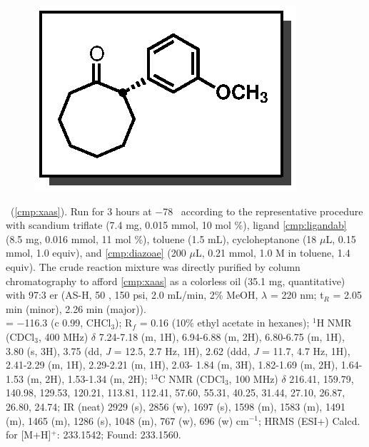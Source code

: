 \pagebreak
\begin{figure}
  \vspace{-12pt}
  \begin{center}
    \includegraphics[scale=0.8]{chp_asymmetric/images/xaas}
  \end{center}
  \vspace{-25pt}
\end{figure}\noindent \textbf{\CMPxaas}\ (\ref{cmp:xaas}). Run for 3 hours
at $-$78 \degc\  according to the representative procedure with scandium
triflate (7.4 mg, 0.015 mmol, 10 mol \%), ligand \ref{cmp:ligandab} (8.5 mg, 0.016 mmol,
11 mol \%), toluene (1.5 mL), cycloheptanone (18 $\mu$L, 0.15 mmol, 1.0 equiv),
and \ref{cmp:diazoae} (200 $\mu$L, 0.21 mmol, 1.0 M in toluene, 1.4 equiv). The
crude reaction mixture was directly purified by column chromatography to afford
\ref{cmp:xaas} as a colorless oil (35.1 mg, quantitative) with 97:3 er (AS-H, 50
\degc, 150 psi, 2.0 mL/min, 2\% MeOH, $\lambda$ = 220 nm; t$_R$ = 2.05 min
(minor), 2.26 min (major)). \\
\rotation = $-$116.3 (c 0.99, CHCl$_3$); R$_f$ = 0.16 (10\% ethyl acetate in
hexanes); $^1$H NMR (CDCl$_3$, 400 MHz) $\delta$ 7.24-7.18 (m, 1H), 6.94-6.88
(m, 2H), 6.80-6.75 (m, 1H), 3.80 (s, 3H), 3.75 (dd, \textit{J} =  12.5, 2.7 Hz,
1H), 2.62 (ddd, \textit{J} =  11.7, 4.7 Hz, 1H), 2.41-2.29 (m, 1H), 2.29-2.21
(m, 1H), 2.03- 1.84 (m, 3H), 1.82-1.69 (m, 2H), 1.64-1.53 (m, 2H), 1.53-1.34 (m,
2H); $^{13}$C NMR (CDCl$_3$, 100 MHz) $\delta$ 216.41, 159.79, 140.98, 129.53,
120.21, 113.81, 112.41, 57.60, 55.31, 40.25, 31.44, 27.10, 26.87, 26.80, 24.74;
IR (neat) 2929 (s), 2856 (w), 1697 (s), 1598 (m), 1583 (m), 1491 (m), 1465 (m),
1286 (s), 1048 (m), 767 (w), 696 (w) cm$^{-1}$; HRMS (ESI+) Calcd. for
 [M+H]$^+$: 233.1542; Found: 233.1560. \\
